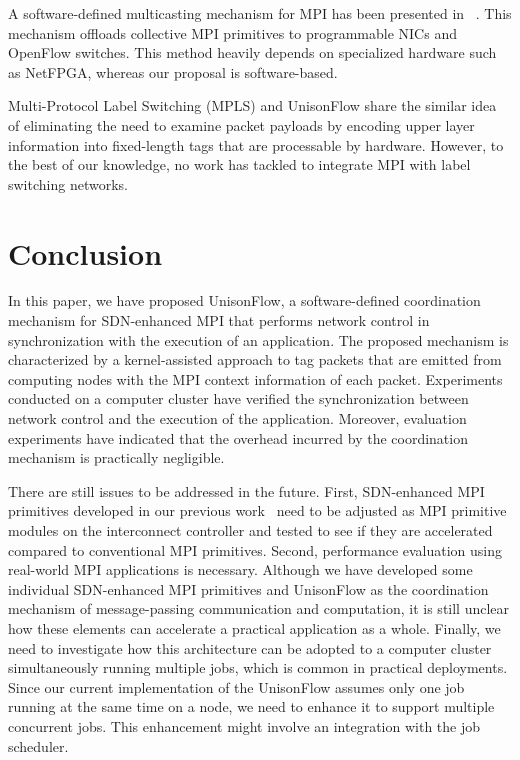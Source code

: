 A software-defined multicasting mechanism for MPI has been presented in
~\autocite{Arap2014}. This mechanism offloads collective MPI primitives
to programmable NICs and OpenFlow switches. This method heavily depends
on specialized hardware such as NetFPGA, whereas our proposal is
software-based.

Multi-Protocol Label Switching (MPLS) and UnisonFlow share the similar
idea of eliminating the need to examine packet payloads by encoding
upper layer information into fixed-length tags that are processable by
hardware. However, to the best of our knowledge, no work has tackled to
integrate MPI with label switching networks.

\hypertarget{conclusion}{%
\section{Conclusion}\label{conclusion}}

In this paper, we have proposed UnisonFlow, a software-defined
coordination mechanism for SDN-enhanced MPI that performs network
control in synchronization with the execution of an application. The
proposed mechanism is characterized by a kernel-assisted approach to tag
packets that are emitted from computing nodes with the MPI context
information of each packet. Experiments conducted on a computer cluster
have verified the synchronization between network control and the
execution of the application. Moreover, evaluation experiments have
indicated that the overhead incurred by the coordination mechanism is
practically negligible.

There are still issues to be addressed in the future. First,
SDN-enhanced MPI primitives developed in our previous
work~\autocites{Dashdavaa2014}{Takahashi2014} need to be adjusted as MPI
primitive modules on the interconnect controller and tested to see if
they are accelerated compared to conventional MPI primitives. Second,
performance evaluation using real-world MPI applications is necessary.
Although we have developed some individual SDN-enhanced MPI primitives
and UnisonFlow as the coordination mechanism of message-passing
communication and computation, it is still unclear how these elements
can accelerate a practical application as a whole. Finally, we need to
investigate how this architecture can be adopted to a computer cluster
simultaneously running multiple jobs, which is common in practical
deployments. Since our current implementation of the UnisonFlow assumes
only one job running at the same time on a node, we need to enhance it
to support multiple concurrent jobs. This enhancement might involve an
integration with the job scheduler.
